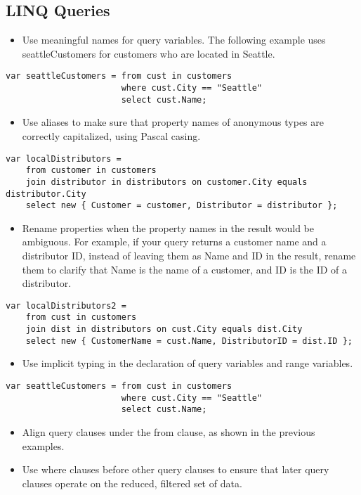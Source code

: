 \documentclass[11pt]{article}
\begin{document}
\subsection{LINQ Queries} %
\label{sub:linq_queries}
\begin{itemize}
	\item Use meaningful names for query variables. The following example uses seattleCustomers for customers who are located in Seattle.
\end{itemize}
\begin{lstlisting}
var seattleCustomers = from cust in customers
                       where cust.City == "Seattle" 
                       select cust.Name;
\end{lstlisting}
\begin{itemize}
	\item Use aliases to make sure that property names of anonymous types are correctly capitalized, using Pascal casing.
\end{itemize}
\begin{lstlisting}
var localDistributors =
    from customer in customers
    join distributor in distributors on customer.City equals distributor.City
    select new { Customer = customer, Distributor = distributor };
\end{lstlisting}
\begin{itemize}
	\item Rename properties when the property names in the result would be ambiguous. For example, if your query returns a customer name and a distributor ID, instead of leaving them as Name and ID in the result, rename them to clarify that Name is the name of a customer, and ID is the ID of a distributor.
\end{itemize}
\begin{lstlisting}
var localDistributors2 =
    from cust in customers
    join dist in distributors on cust.City equals dist.City
    select new { CustomerName = cust.Name, DistributorID = dist.ID };
\end{lstlisting}
\begin{itemize}
	\item Use implicit typing in the declaration of query variables and range variables.
\end{itemize}
\begin{lstlisting}
var seattleCustomers = from cust in customers
                       where cust.City == "Seattle" 
                       select cust.Name;
\end{lstlisting}
\begin{itemize}
	\item Align query clauses under the from clause, as shown in the previous examples.
	\item Use where clauses before other query clauses to ensure that later query clauses operate on the reduced, filtered set of data.
\end{itemize}
\end{document}
